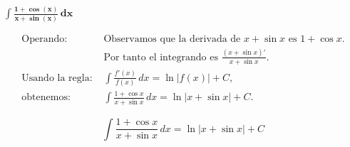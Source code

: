 $\displaystyle \mathbf{\int \frac{1+\cos(x)}{x+\sin(x)}\,dx}$

\nopagebreak
$$
\begin{aligned}
\text{Operando: } &
\text{Observamos que la derivada de } x+\sin x \text{ es } 1+\cos x. \\[6pt]
&\text{Por tanto el integrando es } \frac{(x+\sin x)'}{x+\sin x}. \\[8pt]
\text{Usando la regla: } &
\int \frac{f'(x)}{f(x)}\,dx = \ln\big|f(x)\big| + C, \\[6pt]
\text{obtenemos: } &
\int \frac{1+\cos x}{x+\sin x}\,dx
= \ln\big|x+\sin x\big| + C.
\end{aligned}
$$

$$
\boxed{\displaystyle 
\int \frac{1+\cos x}{x+\sin x}\,dx
= \ln\big|x+\sin x\big| + C}
$$
